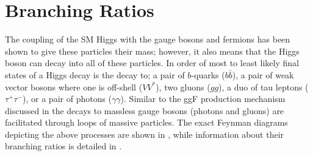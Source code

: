 \section{Branching Ratios} \label{sec:higgs:branching}

The coupling of the SM Higgs with the gauge bosons and fermions has been shown
to give these particles their mass; however, it also means that the Higgs boson can
decay into all of these particles.  In order of most to least likely final
states of a Higgs decay is the decay to; a pair of $b$-quarks ($b\bar{b}$),
a pair of weak vector bosons where one is off-shell ($VV^{*}$), two gluons
($gg$), a duo of tau leptons ($\tau^{+}\tau^{-}$), or a pair of photons
($\gamma\gamma$).  Similar to the ggF production mechanism discussed in
 the decays to massless gauge bosons (photons and
gluons) are facilitated through loops of massive particles. The exact Feynman
diagrams depicting the above processes are shown in , while
information about their branching ratios is detailed in
.

